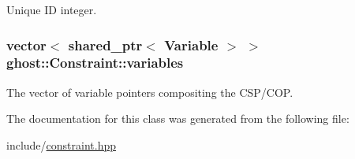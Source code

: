 Unique I\-D integer. 

\hypertarget{classghost_1_1Constraint_a14585a4765af0acb14a14788929726c3}{
\subsubsection[{variables}]{\setlength{\rightskip}{0pt plus 5cm}vector$<$ shared\-\_\-ptr$<$ {\bf Variable} $>$ $>$ ghost\-::\-Constraint\-::variables\hspace{0.3cm}{\ttfamily [protected]}}}\label{classghost_1_1Constraint_a14585a4765af0acb14a14788929726c3}


The vector of variable pointers compositing the C\-S\-P/\-C\-O\-P. 



The documentation for this class was generated from the following file\-:\begin{DoxyCompactItemize}
\item 
include/\hyperlink{constraint_8hpp}{constraint.\-hpp}\end{DoxyCompactItemize}
